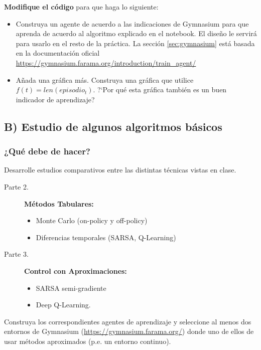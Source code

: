 \documentclass[a4paper, 11pt]{article}
\begin{document}
\textbf{Modifique el código} para que haga lo siguiente:
\begin{itemize}
\item Construya un agente de acuerdo a las indicaciones de Gymnasium para que aprenda de acuerdo al algoritmo explicado en el notebook. El diseño le servirá para usarlo en el resto de la práctica. La sección \ref{sec:gymnasium} está basada en la documentación oficial \url{https://gymnasium.farama.org/introduction/train_agent/}

\item Añada una gráfica más. Construya una gráfica que utilice  $f(t)=len(episodio_t)$. ?`Por qué esta gráfica también es un buen indicador de aprendizaje? 
\end{itemize}


  

\subsection*{B) Estudio de algunos algoritmos básicos}


\subsubsection*{¿Qué debe de hacer?}


Desarrolle estudios comparativos entre las distintas técnicas vistas en clase. 
\begin{description}
\item[Parte 2.] \textbf{Métodos Tabulares:} 
	\begin{itemize}
	\item Monte Carlo (on-policy y off-policy)
	\item Diferencias temporales (SARSA, Q-Learning)
	\end{itemize}
	
\item[Parte 3.] \textbf{Control con Aproximaciones:} 
	\begin{itemize}
	\item SARSA semi-gradiente
	\item Deep Q-Learning. 
	\end{itemize}
\end{description}

Construya los correspondientes agentes de aprendizaje y seleccione al menos dos entornos de Gymnasium (\url{https://gymnasium.farama.org/}) donde uno de ellos  de usar métodos aproximados (p.e. un entorno continuo).
\end{document}
